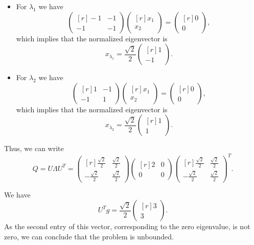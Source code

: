 \begin{itemize}
\item For $\lambda_1$ we have $$\begin{pmatrix*}[r]
  -1&-1\\-1&-1\end{pmatrix*} \begin{pmatrix*}[r] x_1
    \\ x_2\end{pmatrix*} = \begin{pmatrix*}[r] 0\\0\end{pmatrix*},$$
      which implies that the normalized eigenvector is
      \[
      x_{\lambda_1}=\frac{\sqrt{2}}{2}\begin{pmatrix*}[r] 1\\-1\end{pmatrix*}.
      \]
\item For $\lambda_2$ we have $$\begin{pmatrix*}[r]
  1&-1\\-1&1\end{pmatrix*} \begin{pmatrix*}[r] x_1
    \\ x_2\end{pmatrix*} = \begin{pmatrix*}[r] 0\\0\end{pmatrix*},$$
      which implies that the normalized eigenvector is
      \[
      x_{\lambda_2}=\frac{\sqrt{2}}{2}\begin{pmatrix*}[r]
        1\\1\end{pmatrix*}.
        \]
\end{itemize}

Thus, we can write $$Q= U \Lambda U^T = \begin{pmatrix*}[r] \frac{\sqrt{2}}{2}&\frac{\sqrt{2}}{2}\\-\frac{\sqrt{2}}{2}&\frac{\sqrt{2}}{2}\end{pmatrix*} 
\begin{pmatrix*}[r] 2&0\\0&0\end{pmatrix*} \begin{pmatrix*}[r] \frac{\sqrt{2}}{2}&\frac{\sqrt{2}}{2}\\-\frac{\sqrt{2}}{2}&\frac{\sqrt{2}}{2}\end{pmatrix*}^T.$$

  We have
  \[
  U^Tg= \frac{\sqrt{2}}{2} \begin{pmatrix*}[r]
    3\\3 \end{pmatrix*}.
  \]
As the second entry of this vector, corresponding to the zero eigenvalue, is not
zero, we can conclude that the problem is unbounded.

